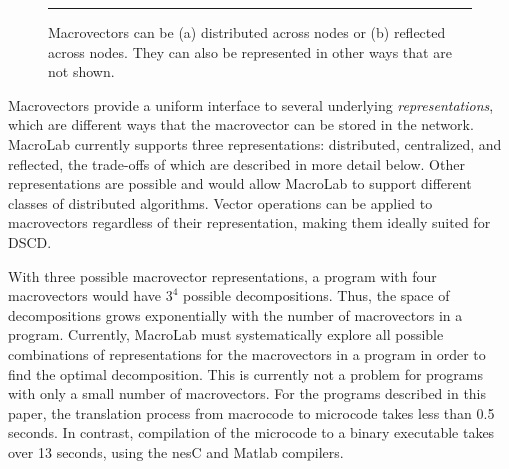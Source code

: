 \begin{figure}[t]
  \centering
   
  \smallskip
  \hrule
  \caption[Example macrovector representations.]{Macrovectors can be
    (a) distributed across nodes or (b) reflected across nodes. They
    can also be represented in other ways that are not shown.}
\end{figure}

Macrovectors provide a uniform interface to several underlying {\em
  representations}, which are different ways that the macrovector can
be stored in the network.  MacroLab currently supports three
representations: distributed, centralized, and reflected, the
trade-offs of which are described in more detail below.  Other
representations are possible and would allow MacroLab to support
different classes of distributed algorithms.  Vector operations can be
applied to macrovectors regardless of their representation, making
them ideally suited for DSCD.

With three possible macrovector representations, a program with four
macrovectors would have $3^4$ possible decompositions.  Thus, the space of
decompositions grows exponentially with the number of macrovectors in a program.
Currently, MacroLab must systematically explore all possible combinations of
representations for the macrovectors in a program in order to find the optimal
decomposition.  This is currently not a problem for programs with only a small
number of macrovectors. For the programs described in this paper, the
translation process from macrocode to microcode takes less than 0.5 seconds.  In
contrast, compilation of the microcode to a binary executable takes over 13
seconds, using the nesC and Matlab compilers.

